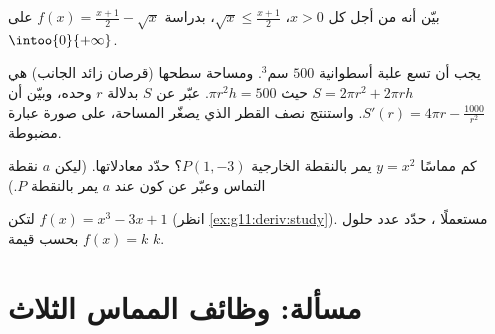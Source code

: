 \begin{exercise}[$\star\star$]\label{exo:g11:deriv:9}
بيّن أنه من أجل كل $x > 0$، $\sqrt{x} \leq \frac{x + 1}{2}$، بدراسة
 $f(x) = \frac{x+1}{2} - \sqrt x$ على $\intoo{0}{+\infty}$.
\end{exercise}

\begin{exercise}[$\star\star$]\label{exo:g11:deriv:10}
يجب أن تسع علبة أسطوانية $500$ سم$^3$. ومساحة سطحها (قرصان زائد
الجانب) هي $S = 2\pi r^2 + 2\pi r h$ حيث $\pi r^2 h = 500$. عبّر عن $S$
بدلالة $r$ وحده، وبيّن أن $S'(r) = 4\pi r -
\frac{1000}{r^2}$. واستنتج نصف القطر الذي يصغّر المساحة، على صورة
عبارة مضبوطة.
\end{exercise}

\begin{exercise}[$\star\star\star$]\label{exo:g11:deriv:11}
كم مماسًا  $y = x^2$ يمر بالنقطة الخارجية
$P(1, -3)$؟ حدّد معادلاتها. (ليكن $a$ 
نقطة التماس وعبّر عن كون  عند $a$ يمر بالنقطة $P$.)
\end{exercise}

\begin{exercise}[$\star\star\star$]\label{exo:g11:deriv:12}
لتكن $f(x) = x^3 - 3x + 1$ (انظر \cref{ex:g11:deriv:study}). مستعملًا
، حدّد عدد حلول 
$f(x) = k$ بحسب قيمة  $k$.
\end{exercise}

\section{مسألة: وظائف المماس الثلاث}


